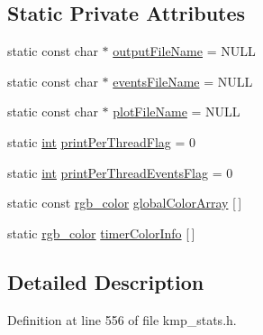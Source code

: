 \subsection*{Static Private Attributes}
\begin{DoxyCompactItemize}
\item 
static const char $\ast$ \hyperlink{classkmp__stats__output__module_a6df3664723fafa911c12fb75870a98ae}{output\-File\-Name} = N\-U\-L\-L
\item 
static const char $\ast$ \hyperlink{classkmp__stats__output__module_abeb05f889265a698f6d82f1a66f0ea6d}{events\-File\-Name} = N\-U\-L\-L
\item 
static const char $\ast$ \hyperlink{classkmp__stats__output__module_ab28d6e78e962dd887f82a6733d82b0ab}{plot\-File\-Name} = N\-U\-L\-L
\item 
static \hyperlink{ittnotify__static_8h_a8b8dcd723308a8cb5d84277c7a3fff70}{int} \hyperlink{classkmp__stats__output__module_adfe5f484599e868c3695086fa3618640}{print\-Per\-Thread\-Flag} = 0
\item 
static \hyperlink{ittnotify__static_8h_a8b8dcd723308a8cb5d84277c7a3fff70}{int} \hyperlink{classkmp__stats__output__module_abfc8ceea0aeda3190a597aa12b1594e8}{print\-Per\-Thread\-Events\-Flag} = 0
\item 
static const \hyperlink{structkmp__stats__output__module_1_1rgb__color}{rgb\-\_\-color} \hyperlink{classkmp__stats__output__module_a578d32fddbaab00f209b626829d85fa2}{global\-Color\-Array} \mbox{[}$\,$\mbox{]}
\item 
static \hyperlink{structkmp__stats__output__module_1_1rgb__color}{rgb\-\_\-color} \hyperlink{classkmp__stats__output__module_ae48e88844238bed4a9994a095a99726d}{timer\-Color\-Info} \mbox{[}$\,$\mbox{]}
\end{DoxyCompactItemize}


\subsection{Detailed Description}


Definition at line 556 of file kmp\-\_\-stats.\-h.



